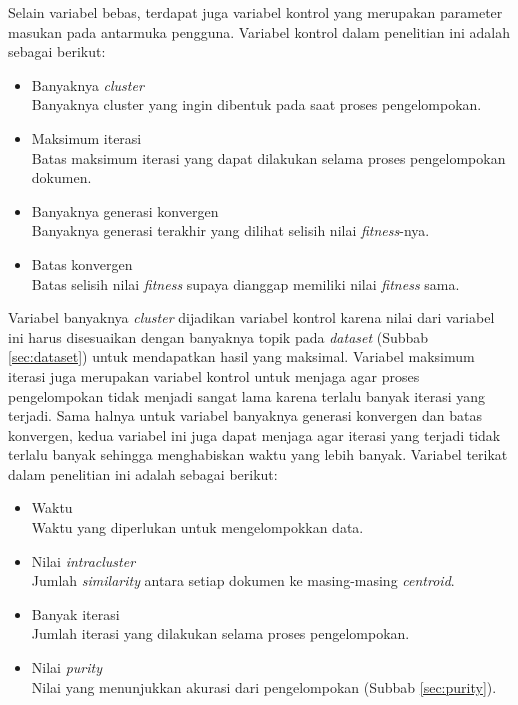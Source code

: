 Selain variabel bebas, terdapat juga variabel kontrol yang merupakan parameter masukan pada antarmuka pengguna. Variabel kontrol dalam penelitian ini adalah sebagai berikut:

\begin{itemize}
	\item Banyaknya \textit{cluster} \\
	Banyaknya cluster yang ingin dibentuk pada saat proses pengelompokan.
	\item Maksimum iterasi \\
	Batas maksimum iterasi yang dapat dilakukan selama proses pengelompokan dokumen.
	\item Banyaknya generasi konvergen \\
	Banyaknya generasi terakhir yang dilihat selisih nilai \textit{fitness}-nya.
	\item Batas konvergen \\
	Batas selisih nilai \textit{fitness} supaya dianggap memiliki nilai \textit{fitness} sama.
\end{itemize}

Variabel banyaknya \textit{cluster} dijadikan variabel kontrol karena nilai dari variabel ini harus disesuaikan dengan banyaknya topik pada \textit{dataset} (Subbab \ref{sec:dataset}) untuk mendapatkan hasil yang maksimal. Variabel maksimum iterasi juga merupakan variabel kontrol untuk menjaga agar proses pengelompokan tidak menjadi sangat lama karena terlalu banyak iterasi yang terjadi. Sama halnya untuk variabel banyaknya generasi konvergen dan batas konvergen, kedua variabel ini juga dapat menjaga agar iterasi yang terjadi tidak terlalu banyak sehingga menghabiskan waktu yang lebih banyak. Variabel terikat dalam penelitian ini adalah sebagai berikut:

\begin{itemize}
	\item Waktu \\
	Waktu yang diperlukan untuk mengelompokkan data.
	\item Nilai \textit{intracluster} \\
	Jumlah \textit{similarity} antara setiap dokumen ke masing-masing \textit{centroid}.
	\item Banyak iterasi \\
	Jumlah iterasi yang dilakukan selama proses pengelompokan.
	\item Nilai \textit{purity} \\
	Nilai yang menunjukkan akurasi dari pengelompokan (Subbab \ref{sec:purity}).
\end{itemize}


